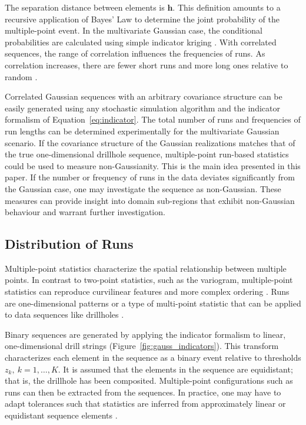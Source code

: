 The separation distance between elements is $\mathbf{h}$. This definition amounts to a recursive application of Bayes' Law to determine the joint probability of the multiple-point event. In the multivariate Gaussian case, the conditional probabilities are calculated using simple indicator kriging \citep{journel1989nongaussian}. With correlated sequences, the range of correlation influences the frequencies of runs. As correlation increases, there are fewer short runs and more long ones relative to random \citep{ortiz2003characterization}.

Correlated Gaussian sequences with an arbitrary covariance structure can be easily generated using any stochastic simulation algorithm and the indicator formalism of Equation~\ref{eq:indicator}. The total number of runs and frequencies of run lengths can be determined experimentally for the multivariate Gaussian scenario. If the covariance structure of the Gaussian realizations matches that of the true one-dimensional drillhole sequence, multiple-point run-based statistics could be used to measure non-Gaussianity. This is the main idea presented in this paper. If the number or frequency of runs in the data deviates significantly from the Gaussian case, one may investigate the sequence as non-Gaussian. These measures can provide insight into domain sub-regions that exhibit non-Gaussian behaviour and warrant further investigation.

\FloatBarrier
\subsection{Distribution of Runs}
\label{subsec:03runs}

Multiple-point statistics characterize the spatial relationship between multiple points. In contrast to two-point statistics, such as the variogram, multiple-point statistics can reproduce curvilinear features and more complex ordering \citep{guardiano1993multivariate}. Runs are one-dimensional patterns or a type of multi-point statistic that can be applied to data sequences like drillholes \citep{boisvert2007multiplepoint}.

Binary sequences are generated by applying the indicator formalism to linear, one-dimensional drill strings (Figure~\ref{fig:gauss_indicators}). This transform characterizes each element in the sequence as a binary event relative to thresholds $z_{k}, \ k=1,\dots,K$. It is assumed that the elements in the sequence are equidistant; that is, the drillhole has been composited. Multiple-point configurations such as runs can then be extracted from the sequences. In practice, one may have to adapt tolerances such that statistics are inferred from approximately linear or equidistant sequence elements \citep{ortiz2003characterization}.


